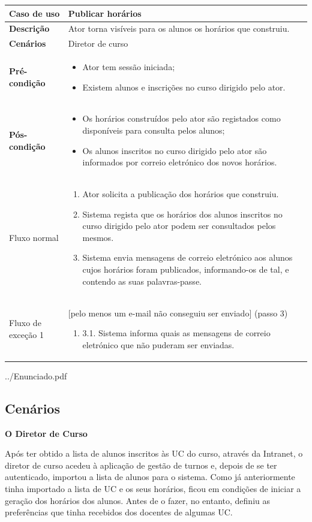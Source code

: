 \documentclass[12pt, a4paper]{article}
\makeatletter
\renewcommand\section[1]{
    \newpage
    \thispagestyle{empty}
    \vspace*{\fill}
    \@startsection{section}{1}{\z@}{0px}{50px}{\normalfont\Huge\bfseries}{#1}
    \vspace*{\fill}
    \newpage
}
\newenvironment{condition}{
    \begin{itemize}[wide=0pt]
        \vspace{-0.2cm}
}{
        \vspace{-0.5cm}
    \end{itemize}
}
\newcommand\flow[1]{
    Fluxo normal &
    \singlespacing
    \begin{enumerate}[wide=0pt]
        #1
        \vspace{-0.3cm}
    \end{enumerate} \\ \hline
}
\newcommand\otherflow[3]{
    #1 &
    #2
    \singlespacing
    \begin{enumerate}[wide=0pt]
        #3
        \vspace{-0.3cm}
    \end{enumerate} \\ \hline
}
\newenvironment{usecase}[5]{
    \begin{table}[H]
        \centering
        \begin{tabular}{|>{\centering\arraybackslash\bf}m{3cm}|m{13cm}|}
            \hline
            Caso de uso & \textbf{#1} \\

            \hline
            Descrição & #2 \\

            \hline
            Cenários & #3 \\

            \hline
            Pré-condição &
            \begin{condition}
                #4
            \end{condition} \\

            \hline
            Pós-condição &
            \begin{condition}
                #5
            \end{condition} \\

            \hline
}{
    \end{tabular}
\end{table}
}
\makeatother
\begin{document}
\begin{usecase}
    {Publicar horários}
    {Ator torna visíveis para os alunos os horários que construiu.}
    {Diretor de curso}
    {
        \item Ator tem sessão iniciada;
        \item Existem alunos e inscrições no curso dirigido pelo ator.
    }
    {
        \item Os horários construídos pelo ator são registados como disponíveis para consulta pelos
            alunos;
        \item Os alunos inscritos no curso dirigido pelo ator são informados por correio eletrónico
            dos novos horários.
    }

    \flow{
        \item Ator solicita a publicação dos horários que construiu.
        \item Sistema regista que os horários dos alunos inscritos no curso dirigido pelo ator podem
            ser consultados pelos mesmos.
        \item Sistema envia mensagens de correio eletrónico aos alunos cujos horários foram
            publicados, informando-os de tal, e contendo as suas palavras-passe.
    }

    \otherflow{Fluxo de exceção 1}{[pelo menos um e-mail não conseguiu ser enviado] (passo 3)}{
        \item[3.1.] Sistema informa quais as mensagens de correio eletrónico que não puderam ser
            enviadas.
    }
\end{usecase}


\section{Anexos}


    {../Enunciado.pdf}


\subsection{Cenários}
\label{use-cases}

\textbf{O Diretor de Curso}

Após ter obtido a lista de alunos inscritos às UC do curso, através da Intranet, o diretor de curso
acedeu à aplicação de gestão de turnos e, depois de se ter autenticado, importou a lista de alunos
para o sistema. Como já anteriormente tinha importado a lista de UC e os seus horários, ficou em
condições de iniciar a geração dos horários dos alunos. Antes de o fazer, no entanto, definiu as
preferências que tinha recebidos dos docentes de algumas UC.
\end{document}
